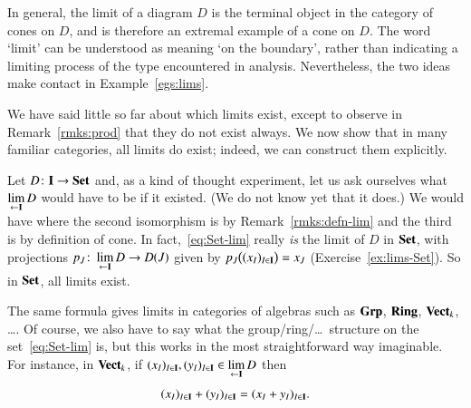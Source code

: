 In general, the limit of a diagram $D$ is the terminal object in the
category of cones on $D$, and is therefore an extremal example of a cone on
$D$.  The word `limit' can be understood as meaning `on the boundary',
rather than indicating a limiting process of the type encountered in
analysis.  Nevertheless, the two ideas make contact in
Example~\ref{egs:lims}.

We have said little so far about which limits exist, except to observe in
Remark~\ref{rmks:prod} that they do not exist
always.  We now show that in many familiar categories, all limits do exist;
indeed, we can construct them explicitly.

\begin{example} 
\label{eg:lims-Set}
Let $D\from \scat{I} \to \Set$ and, as a kind of thought%
%
%
experiment, let us ask ourselves what $\lim\limits_{\leftarrow \mathbf{I}} D$%
%
%
would have to be if it existed.  (We do not know yet that it does.)  We
would have
% 
% 
where the second isomorphism is by
Remark~\ref{rmks:defn-lim} and the third is by
definition of cone.  In fact,~\eqref{eq:Set-lim} really \emph{is} the limit
of $D$ in $\mathbf{Set}$, with projections $p_J\from \lt{\scat{I}} D \to D(J)$
given by $p_J\bigl( (x_I)_{I \in \mathbf{I}} \bigr) = x_J$
(Exercise~\ref{ex:lims-Set}).  So in $\mathbf{Set}$, all limits exist.
\end{example}

\begin{example} 
\label{eg:lims-alg}
The same formula gives limits in categories of algebras such as $\mathbf{Grp}$,%
%
%
$\mathbf{Ring}$,%
%
%
$\mathbf{Vect}_k$,%
%
%
\ldots.  Of course, we also have to say what the
group/ring/\ldots\ structure on the set~\eqref{eq:Set-lim} is, but this
works in the most straightforward way imaginable.  For instance, in
$\mathbf{Vect}_k$, if $(x_I)_{I \in \mathbf{I}}, (y_I)_{I \in \mathbf{I}} \in
\lim\limits_{\leftarrow \mathbf{I}} D$ then
\[
(x_I)_{I \in \mathbf{I}} + (y_I)_{I \in \mathbf{I}}
=
(x_I + y_I)_{I \in \mathbf{I}}.
\]
\end{example}

